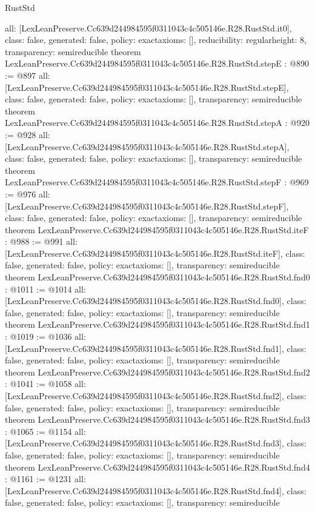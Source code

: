 \begin{lexlean}{RustStd}
\begin{coremodule}
{  all: [LexLeanPreserve.Cc639d244984595f0311043c4c505146e.R28.RustStd.it0],
  class: false,
  generated: false,
  policy: exact{axioms: []},
  reducibility: regular{height: 8},
  transparency: semireducible
}
theorem LexLeanPreserve.Cc639d244984595f0311043c4c505146e.R28.RustStd.stepE : @890 := @897 {
  all: [LexLeanPreserve.Cc639d244984595f0311043c4c505146e.R28.RustStd.stepE],
  class: false,
  generated: false,
  policy: exact{axioms: []},
  transparency: semireducible
}
theorem LexLeanPreserve.Cc639d244984595f0311043c4c505146e.R28.RustStd.stepA : @920 := @928 {
  all: [LexLeanPreserve.Cc639d244984595f0311043c4c505146e.R28.RustStd.stepA],
  class: false,
  generated: false,
  policy: exact{axioms: []},
  transparency: semireducible
}
theorem LexLeanPreserve.Cc639d244984595f0311043c4c505146e.R28.RustStd.stepF : @969 := @976 {
  all: [LexLeanPreserve.Cc639d244984595f0311043c4c505146e.R28.RustStd.stepF],
  class: false,
  generated: false,
  policy: exact{axioms: []},
  transparency: semireducible
}
theorem LexLeanPreserve.Cc639d244984595f0311043c4c505146e.R28.RustStd.iteF : @988 := @991 {
  all: [LexLeanPreserve.Cc639d244984595f0311043c4c505146e.R28.RustStd.iteF],
  class: false,
  generated: false,
  policy: exact{axioms: []},
  transparency: semireducible
}
theorem LexLeanPreserve.Cc639d244984595f0311043c4c505146e.R28.RustStd.fnd0 : @1011 := @1014 {
  all: [LexLeanPreserve.Cc639d244984595f0311043c4c505146e.R28.RustStd.fnd0],
  class: false,
  generated: false,
  policy: exact{axioms: []},
  transparency: semireducible
}
theorem LexLeanPreserve.Cc639d244984595f0311043c4c505146e.R28.RustStd.fnd1 : @1019 := @1036 {
  all: [LexLeanPreserve.Cc639d244984595f0311043c4c505146e.R28.RustStd.fnd1],
  class: false,
  generated: false,
  policy: exact{axioms: []},
  transparency: semireducible
}
theorem LexLeanPreserve.Cc639d244984595f0311043c4c505146e.R28.RustStd.fnd2 : @1041 := @1058 {
  all: [LexLeanPreserve.Cc639d244984595f0311043c4c505146e.R28.RustStd.fnd2],
  class: false,
  generated: false,
  policy: exact{axioms: []},
  transparency: semireducible
}
theorem LexLeanPreserve.Cc639d244984595f0311043c4c505146e.R28.RustStd.fnd3 : @1065 := @1154 {
  all: [LexLeanPreserve.Cc639d244984595f0311043c4c505146e.R28.RustStd.fnd3],
  class: false,
  generated: false,
  policy: exact{axioms: []},
  transparency: semireducible
}
theorem LexLeanPreserve.Cc639d244984595f0311043c4c505146e.R28.RustStd.fnd4 : @1161 := @1231 {
  all: [LexLeanPreserve.Cc639d244984595f0311043c4c505146e.R28.RustStd.fnd4],
  class: false,
  generated: false,
  policy: exact{axioms: []},
  transparency: semireducible
}
\end{coremodule}
\end{lexlean}
